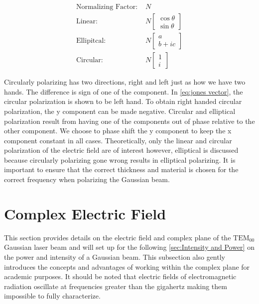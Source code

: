 \documentclass[11pt,a4paper]{book}
\begin{document}
		\begin{equation}
		\label{eq:jones vector}
		\begin{split}
		\text{Normalizing Factor: }& N \\
		\text{Linear: } & N
		\left[\begin{matrix}
		\cos{\theta} \\ \sin{\theta}
		\end{matrix}\right]\\
		\text{Ellipitcal: } & N
		\left[\begin{matrix}
		a \\ b+ic
		\end{matrix}\right]\\
		\text{Circular: } & N
		\left[\begin{matrix}
		1 \\ i
		\end{matrix}\right]
		\end{split}
		\end{equation}			
		
		Circularly polarizing has two directions, right and left just as how we have two hands. The difference is sign of one of the component. In \autoref{eq:jones vector}, the circular polarization is shown to be left hand. To obtain right handed circular polarization, the y component can be made negative. Circular and elliptical polarization result from having one of the components out of phase relative to the other component. We choose to phase shift the y component to keep the x component constant in all cases. Theoretically, only the linear and circular polarization of the electric field are of interest however, elliptical is discussed because circularly polarizing gone wrong results in elliptical polarizing. It is important to ensure that the correct thickness and material is chosen for the correct frequency when polarizing the Gaussian beam.
		

	\section{Complex Electric Field}
		\label{sec:Complex Electric Field}
		This section provides details on the electric field and complex plane of the $\text{TEM}_{00}$ Gaussian laser beam and will set up for the following \autoref{sec:Intensity and Power} on the power and intensity of a Gaussian beam. This subsection also gently introduces the concepts and advantages of working within the complex plane for academic purposes. It should be noted that electric fields of electromagnetic radiation oscillate at frequencies greater than the gigahertz making them impossible to fully characterize. 
		
\end{document}
